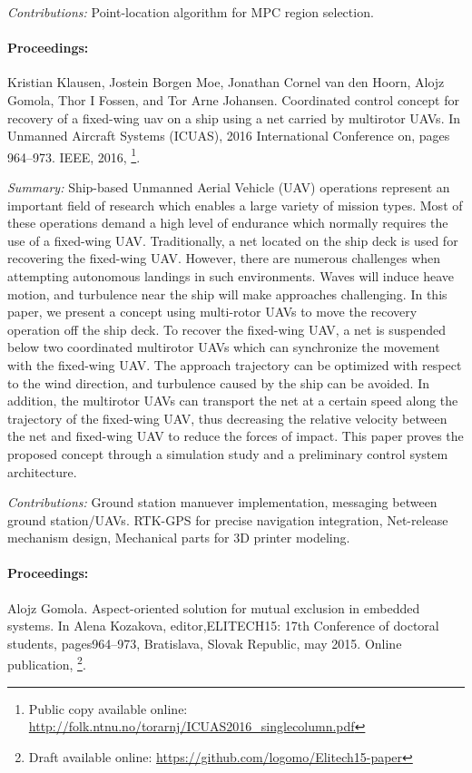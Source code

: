 \emph{Contributions:} Point-location algorithm for MPC region selection. 

\paragraph{Proceedings:} Kristian Klausen, Jostein Borgen Moe, Jonathan Cornel van den Hoorn, Alojz Gomola, Thor I Fossen, and Tor Arne Johansen. Coordinated control concept for recovery of a fixed-wing uav on a ship using a net carried by multirotor UAVs.  In Unmanned Aircraft Systems (ICUAS), 2016 International Conference on, pages 964–973. IEEE, 2016, \cite{klausen2016coordinated}\footnote{Public copy available online: \url{http://folk.ntnu.no/torarnj/ICUAS2016_singlecolumn.pdf}}.

\emph{Summary:} Ship-based Unmanned Aerial Vehicle (UAV) operations represent an important field of research which enables a large variety of mission types. Most of these operations demand a high level of endurance which normally requires the use of a fixed-wing UAV. Traditionally, a net located on the ship deck is used for recovering the fixed-wing UAV. However, there are numerous challenges when attempting autonomous landings in such environments. Waves will induce heave motion, and turbulence near the ship will make approaches challenging. In this paper, we present a concept using multi-rotor UAVs to move the recovery operation off the ship deck. To recover the fixed-wing UAV, a net is suspended below two coordinated multirotor UAVs which can synchronize the movement with the fixed-wing UAV. The approach trajectory can be optimized with respect to the wind direction, and turbulence caused by the ship can be avoided. In addition, the multirotor UAVs can transport the net at a certain speed along the trajectory of the fixed-wing UAV, thus decreasing the relative velocity between the net and fixed-wing UAV to reduce the forces of impact. This paper proves the proposed concept through a simulation study and a preliminary control system architecture.

\emph{Contributions:} Ground station manuever implementation, messaging between ground station/UAVs. RTK-GPS for precise navigation integration, Net-release mechanism design, Mechanical parts for 3D printer modeling. 

\paragraph{Proceedings:}  Alojz Gomola.  Aspect-oriented solution for mutual exclusion in embedded systems. In Alena Kozakova, editor,ELITECH15: 17th Conference of doctoral students, pages964–973, Bratislava, Slovak Republic, may 2015. Online publication, \cite{gomola2015aspectOriented}\footnote{Draft available online: \url{https://github.com/logomo/Elitech15-paper}}.

